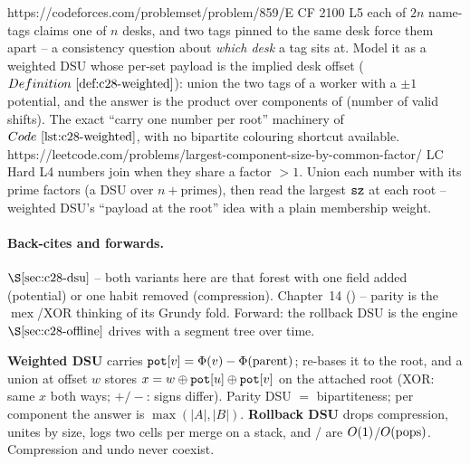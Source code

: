 \begin{practiceset}
    {https://codeforces.com/problemset/problem/859/E}
    {CF 2100 L5}
    {each of \(2n\) name-tags claims one of \(n\) desks, and two tags pinned to
     the same desk force them apart -- a consistency question about \emph{which
     desk} a tag sits at.  Model it as a weighted DSU whose per-set payload is
     the implied desk offset (\(\defref{c28-weighted}\)): union the two tags of a
     worker with a \(\pm1\) potential, and the answer is the product over
     components of (number of valid shifts).  The exact ``carry one number per
     root'' machinery of \(\coderef{c28-weighted}\), with no bipartite colouring
     shortcut available.}
    {https://leetcode.com/problems/largest-component-size-by-common-factor/}
    {LC Hard L4}
    {numbers join when they share a factor \(>1\).  Union each number with its
     prime factors (a DSU over \(n + \text{primes}\)), then read the largest
     \(\texttt{sz}\) at each root -- weighted DSU's ``payload at the root'' idea
     with a plain membership weight.}
\end{practiceset}

\paragraph{Back-cites and forwards.}
\(\secref{c28-dsu}\) -- both variants here are that forest with one field
added (potential) or one habit removed (compression).  Chapter~14
() -- parity is the \(\operatorname{mex}\)/XOR thinking of its
Grundy fold.  Forward: the rollback DSU is the engine
\(\secref{c28-offline}\) drives with a segment tree over time.

\begin{recallbox}
\textbf{Weighted DSU} carries \(\texttt{pot}[v]=\Phi(v)-\Phi(\text{parent})\);
 re-bases it to the root, and a union at offset \(w\) stores
\(x=w\oplus\texttt{pot}[u]\oplus\texttt{pot}[v]\) on the attached root (XOR:
same \(x\) both ways; \(+/-\): signs differ).  Parity DSU \(=\)
bipartiteness; per component the answer is \(\max(|A|,|B|)\).  \textbf{Rollback
DSU} drops compression, unites by size, logs two cells per merge on a stack,
and / are \(O(1)\)/\(O(\text{pops})\).
Compression and undo never coexist.
\end{recallbox}
